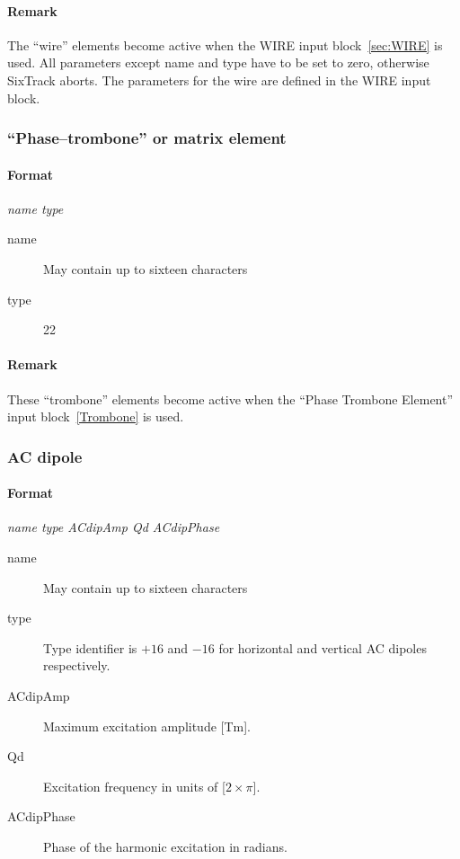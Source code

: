 \documentclass[a4paper,11pt]{report}
\begin{document}
\paragraph{Remark}
The ``wire'' elements become active when the
WIRE input block~\ref{sec:WIRE} is used. All parameters except name and type have to be set to zero, otherwise SixTrack aborts. The parameters for the wire are defined in the WIRE input block.

\subsubsection{``Phase--trombone'' or matrix element} \label{PT}
\paragraph{Format} {\em name type}
\begin{description}
\item [name] May contain up to sixteen characters
\item [type] 22
\end{description}

\paragraph{Remark}
These ``trombone'' elements become active when the
``Phase Trombone Element'' input block~\ref{Trombone} is used.

\subsubsection{AC dipole} \label{ACDIP}
\paragraph{Format} {\em name type ACdipAmp Qd ACdipPhase}
\begin{description}
\item [name] May contain up to sixteen characters
\item [type] Type identifier is $+16$ and $-16$ for horizontal and vertical
  AC dipoles respectively.
\item [ACdipAmp] Maximum excitation amplitude [Tm].
\item [Qd] Excitation frequency in units of [$2 \times \pi$]. 
\item [ACdipPhase] Phase of the harmonic excitation in radians.
\end{description}
\end{document}
